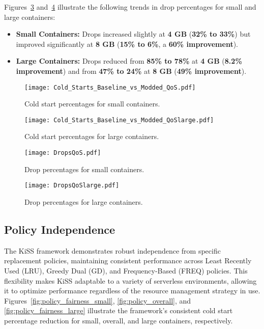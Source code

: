 Figures~\ref{fig:drop_small} and~\ref{fig:drop_large} illustrate the following trends in drop percentages for small and large containers:
    
    \begin{itemize}
        \item \textbf{Small Containers:} Drops increased slightly at \textbf{4 GB} (\textbf{32\% to 33\%}) but improved significantly at \textbf{8 GB} (\textbf{15\% to 6\%}, a \textbf{60\% improvement}).
        \item \textbf{Large Containers:} Drops reduced from \textbf{85\% to 78\%} at \textbf{4 GB} (\textbf{8.2\% improvement}) and from \textbf{47\% to 24\%} at \textbf{8 GB} (\textbf{49\% improvement}).
    \end{itemize}
    

\begin{figure}[h]
    \centering
    \texttt{[image: Cold\_Starts\_Baseline\_vs\_Modded\_QoS.pdf]}
    \caption{Cold start percentages for small containers.}
    \label{fig:cold_start_small}
\end{figure}

\begin{figure}[h]
    \centering
    \texttt{[image: Cold\_Starts\_Baseline\_vs\_Modded\_QoSlarge.pdf]}
    \caption{Cold start percentages for large containers.}
    \label{fig:cold_start_large}
\end{figure}

\begin{figure}[h]
    \centering
    \texttt{[image: DropsQoS.pdf]}
    \caption{Drop percentages for small containers.}
    \label{fig:drop_small}
\end{figure}

\begin{figure}[h]
    \centering
    \texttt{[image: DropsQoSlarge.pdf]}
    \caption{Drop percentages for large containers.}
    \label{fig:drop_large}
\end{figure}


\subsection{Policy Independence}

The KiSS framework demonstrates robust independence from specific replacement policies, maintaining consistent performance across Least Recently Used (LRU), Greedy Dual (GD), and Frequency-Based (FREQ) policies. This flexibility makes KiSS adaptable to a variety of serverless environments, allowing it to optimize performance regardless of the resource management strategy in use. Figures~\ref{fig:policy_fairness_small}, \ref{fig:policy_overall}, and \ref{fig:policy_fairness_large} illustrate the framework’s consistent cold start percentage reduction for small, overall, and large containers, respectively.


